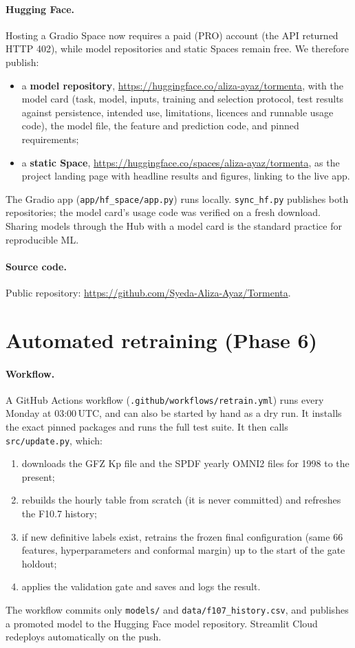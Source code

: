 \documentclass[11pt,a4paper]{article}
\newcommand{\code}[1]{\texttt{#1}}
\begin{document}
\paragraph{Hugging Face.} Hosting a Gradio Space now requires a paid (PRO) account (the API returned HTTP 402),
while model repositories and static Spaces remain free. We therefore publish:
\begin{itemize}
\item a \textbf{model repository}, \url{https://huggingface.co/aliza-ayaz/tormenta}, with the model card (task,
model, inputs, training and selection protocol, test results against persistence, intended use, limitations,
licences and runnable usage code), the model file, the feature and prediction code, and pinned requirements;
\item a \textbf{static Space}, \url{https://huggingface.co/spaces/aliza-ayaz/tormenta}, as the project landing
page with headline results and figures, linking to the live app.
\end{itemize}
The Gradio app (\code{app/hf\_space/app.py}) runs locally. \code{sync\_hf.py} publishes both repositories; the
model card's usage code was verified on a fresh download. Sharing models through the Hub with a model card is the
standard practice for reproducible ML.

\paragraph{Source code.} Public repository: \url{https://github.com/Syeda-Aliza-Ayaz/Tormenta}.

\section{Automated retraining (Phase 6)}\label{sec:retrain}
\paragraph{Workflow.} A GitHub Actions workflow (\code{.github/workflows/retrain.yml}) runs every Monday at
03:00\,UTC, and can also be started by hand as a dry run. It installs the exact pinned packages and runs the full
test suite. It then calls \code{src/update.py}, which:
\begin{enumerate}
\item downloads the GFZ Kp file and the SPDF yearly OMNI2 files for 1998 to the present;
\item rebuilds the hourly table from scratch (it is never committed) and refreshes the F10.7 history;
\item if new definitive labels exist, retrains the frozen final configuration (same 66 features, hyperparameters
and conformal margin) up to the start of the gate holdout;
\item applies the validation gate and saves and logs the result.
\end{enumerate}
The workflow commits only \code{models/} and \code{data/f107\_history.csv}, and publishes a promoted model to the
Hugging Face model repository. Streamlit Cloud redeploys automatically on the push.
\end{document}
